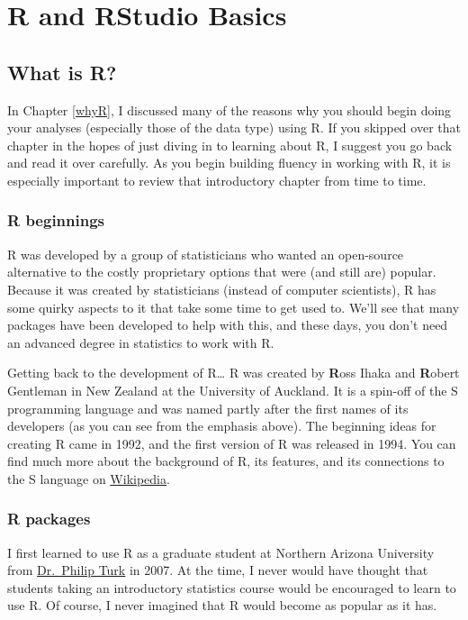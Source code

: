 \documentclass[]{tufte-book}
\begin{document}
\chapter{R and RStudio Basics}\label{rstudiobasics}

\section{What is R?}\label{what-is-r}

In Chapter \ref{whyR}, I discussed many of the reasons why you should begin doing your analyses (especially those of the data type) using R. If you skipped over that chapter in the hopes of just diving in to learning about R, I suggest you go back and read it over carefully. As you begin building fluency in working with R, it is especially important to review that introductory chapter from time to time.

\subsection{R beginnings}\label{r-beginnings}

R was developed by a group of statisticians who wanted an open-source alternative to the costly proprietary options that were (and still are) popular. Because it was created by statisticians (instead of computer scientists), R has some quirky aspects to it that take some time to get used to. We'll see that many packages have been developed to help with this, and these days, you don't need an advanced degree in statistics to work with R.

Getting back to the development of R\ldots{} R was created by \textbf{R}oss Ihaka and \textbf{R}obert Gentleman in New Zealand at the University of Auckland. It is a spin-off of the S programming language and was named partly after the first names of its developers (as you can see from the emphasis above). The beginning ideas for creating R came in 1992, and the first version of R was released in 1994. You can find much more about the background of R, its features, and its connections to the S language on \href{https://en.wikipedia.org/wiki/R_(programming_language)}{Wikipedia}.

\subsection{R packages}\label{r-packages}

I first learned to use R as a graduate student at Northern Arizona University from \href{http://www.stat.colostate.edu/~pturk/}{Dr.~Philip Turk} in 2007. At the time, I never would have thought that students taking an introductory statistics course would be encouraged to learn to use R. Of course, I never imagined that R would become as popular as it has.
\end{document}

